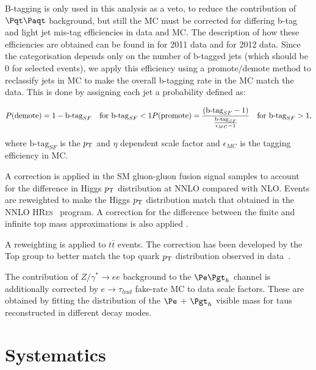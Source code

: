 B-tagging is only used in this analysis as a veto, to reduce the contribution of
$\ttbar$ background, but still the \ac{MC} must be corrected for differing b-tag
and light jet mis-tag efficiencies in data and \ac{MC}. The description of how
these efficiencies are obtained can be found in \cite{CMS-PAS-BTV-11-004} for
2011 data and \cite{CMS-PAS-BTV-13-001} for 2012 data. Since the categorisation 
depends only on the number of b-tagged jets (which should be 0 for selected events), 
we apply this efficiency using a promote/demote method to reclassify jets in \ac{MC} 
to make the overall b-tagging rate in the \ac{MC} match the data. This is done
by assigning each jet a probability defined as:

\begin{equation}
P(\text{demote})  = 1 - \text{b-tag}_{SF} \quad \text{for } \text{b-tag}_{SF} < 1 \\
P(\text{promote}) = \frac{\left(\text{b-tag}_{SF} -
1\right)}{\frac{\text{b-tag}_{SF}}{\epsilon_{MC}-1} } \quad \text{for } \text{b-tag}_{SF} > 1 ,
\end{equation}

where $\text{b-tag}_{SF}$ is the $p_{\mathrm{T}}$ and $\eta$ dependent scale factor and
$\epsilon_{MC}$ is the tagging efficiency in \ac{MC}.

A correction is applied in the \ac{SM} gluon-gluon fusion signal
samples to account for the difference in Higgs $p_{\mathrm{T}}$ distribution at \ac{NNLO}
compared with \ac{NLO}. Events are reweighted to make the Higgs $p_{\mathrm{T}}$
distribution match that obtained in the \ac{NNLO} \textsc{HRes}~\cite{deFlorian:2012mx} program. 
A correction for the difference between the finite and infinite top
mass approximations is also applied \cite{Grazzini:2013mca}.

A reweighting is applied to $t \bar{t}$ events. The correction has been developed by the Top
group to better match the top quark $p_{\mathrm{T}}$ distribution observed in data~\cite{TopPtReweighting}. 

The contribution of $Z/\gamma^{*} \to ee$ background to the $\etau$ channel
is additionally corrected by $e \to \tau_{had}$ fake-rate \ac{MC} to data
scale factors. These are obtained by fitting the distribution of the $\Pe$ +
$\Pgt_{h}$ visible mass for taus reconstructed in different decay modes. 

\section{Systematics}
\label{sec:systematics}

